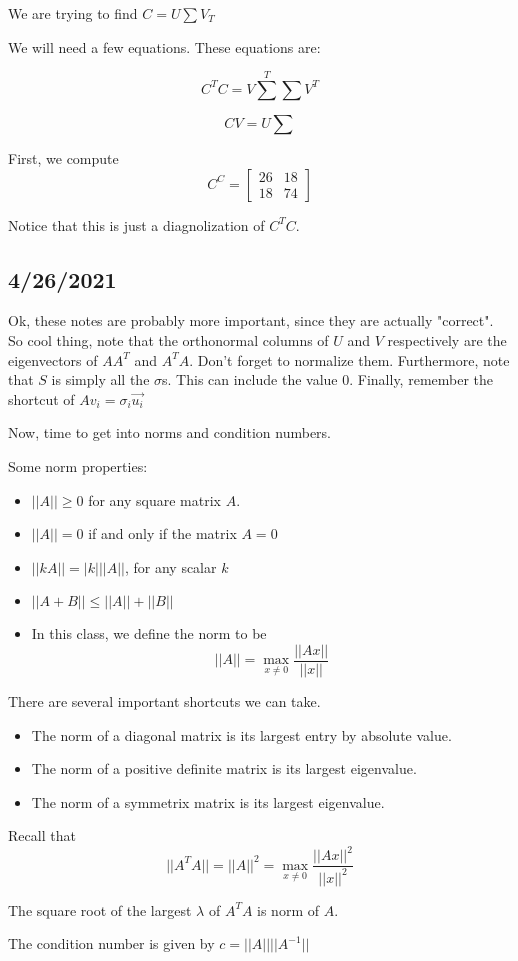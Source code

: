 \documentclass{article}
\begin{document}
We are trying to find $C = U\sum V_T$

We will need a few equations. These equations are:

$$C^TC = V\sum^T\sum V^T$$

$$CV = U \sum$$

First, we compute $$C^C = \begin{bmatrix}26&18\\18&74\end{bmatrix}$$

Notice that this is just a diagnolization of $C^TC$.

\subsection{4/26/2021}

Ok, these notes are probably more important, since they are actually "correct". So cool thing, note that the orthonormal columns of $U$ and $V$ respectively are the eigenvectors of $AA^T$ and $A^TA$. Don't forget to normalize them. Furthermore, note that $S$ is simply all the $\sigma$s. This can include the value $0$. Finally, remember the shortcut of $Av_i=\sigma_i \vec{u_i}$

Now, time to get into norms and condition numbers.

Some norm properties:

\begin{itemize}
	\item $||A||\ge 0$ for any square matrix $A$.
	\item $||A|| = 0$ if and only if the matrix $A=0$
	\item $||kA|| = |k| ||A||$, for any scalar $k$
	\item $||A+B||\le ||A|| + ||B||$
	\item In this class, we define the norm to be $$||A||=\max_{x\neq 0}\frac{||Ax||}{||x||}$$
\end{itemize}

There are several important shortcuts we can take.

\begin{itemize}
	\item The norm of a diagonal matrix is its largest entry by absolute value.
	\item The norm of a positive definite matrix is its largest eigenvalue.
	\item The norm of a symmetrix matrix is its largest eigenvalue.
\end{itemize}

Recall that $$||A^TA||=||A||^2=\max_{x\neq 0}\frac{||Ax||^2}{||x||^2}$$

The square root of the largest $\lambda$ of $A^TA$ is norm of $A$.

The condition number is given by $c=||A||||A^{-1}||$
\end{document}
